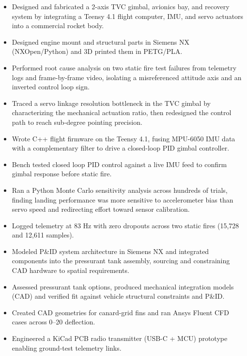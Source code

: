\begin{itemize}
  \item Designed and fabricated a 2-axis TVC gimbal, avionics bay, and recovery system by integrating a Teensy 4.1 flight computer, IMU, and servo actuators into a commercial rocket body.
  \item Designed engine mount and structural parts in Siemens NX (NXOpen/Python) and 3D printed them in PETG/PLA.
  \item Performed root cause analysis on two static fire test failures from telemetry logs and frame-by-frame video, isolating a misreferenced attitude axis and an inverted control loop sign.
  \item Traced a servo linkage resolution bottleneck in the TVC gimbal by characterizing the mechanical actuation ratio, then redesigned the control path to reach sub-degree pointing precision.
  \item Wrote C++ flight firmware on the Teensy 4.1, fusing MPU-6050 IMU data with a complementary filter to drive a closed-loop PID gimbal controller.
  \item Bench tested closed loop PID control against a live IMU feed to confirm gimbal response before static fire.
  \item Ran a Python Monte Carlo sensitivity analysis across hundreds of trials, finding landing performance was more sensitive to accelerometer bias than servo speed and redirecting effort toward sensor calibration.
  \item Logged telemetry at 83 Hz with zero dropouts across two static fires (15,728 and 12,611 samples).
\end{itemize}
\entrygap

\begin{itemize}
  \item Modeled P\&ID system architecture in Siemens NX and integrated components into the pressurant tank assembly, sourcing and constraining CAD hardware to spatial requirements.
  \item Assessed pressurant tank options, produced mechanical integration models (CAD) and verified fit against vehicle structural constraints and P\&ID.
  \item Created CAD geometries for canard-grid fins and ran Ansys Fluent CFD cases across 0--20\textdegree{} deflection.
  \item Engineered a KiCad PCB radio transmitter (USB-C + MCU) prototype enabling ground-test telemetry links.
\end{itemize}
\entrygap

